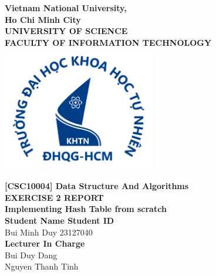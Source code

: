 \begin{titlepage}
	\begin{center}
		\textbf{\LARGE Vietnam National University,}\\[0.5cm]
		\textbf{\LARGE Ho Chi Minh City}\\[0.5cm]
		\vspace{20pt}
		\textbf{\large UNIVERSITY OF SCIENCE}\\[0.2cm]
		\textbf{\large FACULTY OF INFORMATION TECHNOLOGY}\\[0.2cm]
		\vspace{20pt}
		\includegraphics[width=0.5\textwidth,keepaspectratio]{./images/logo.png}

		\par
		\vspace{20pt}
		\textbf{\Large [CSC10004] Data Structure And Algorithms}\\
		\vspace{15pt}
		\myrule[1pt][7pt]
		\textbf{\LARGE EXERCISE 2 REPORT}\\
		\vspace{15pt}
		\textbf{\large Implementing Hash Table from scratch}\\
		\vspace{10pt}
		\myrule[1pt][7pt]
		\vspace{25pt}
		\textbf{\large Student Name \hspace{20pt} Student ID}\\
		Bui Minh Duy \hspace{45pt} 23127040 \\

		\vspace{45pt}
		\textbf {\large Lecturer In Charge}\\[0.2cm]
		\Large {Bui Duy Dang}\\[0.1cm]
		\Large {Nguyen Thanh Tinh}\\[0.1cm]
	\end{center}

	\par
	\vfill
	\begin{center}
		\\
	\end{center}

\end{titlepage}